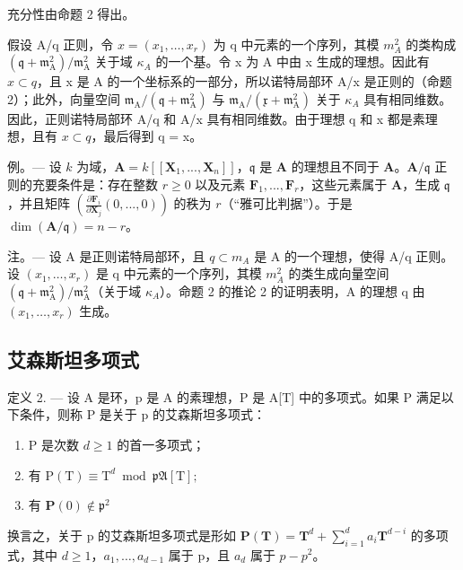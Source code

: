 充分性由命题 2 得出。

假设 A/q 正则，令 \(x = (x_{1}, \ldots, x_{r})\) 为 q 中元素的一个序列，其模 \(m_{A}^{2}\) 的类构成 \((\mathfrak{q} + \mathfrak{m}_{\mathrm{A}}^{2})/\mathfrak{m}_{\mathrm{A}}^{2}\) 关于域 \(\kappa_{A}\) 的一个基。令 x 为 A 中由 x 生成的理想。因此有 \(x \subset q\)，且 x 是 A 的一个坐标系的一部分，所以诺特局部环 A/x 是正则的（命题 2）；此外，向量空间 \(\mathfrak{m}_{\mathrm{A}}/(\mathfrak{q} + \mathfrak{m}_{\mathrm{A}}^{2})\) 与 \(\mathfrak{m}_{\mathrm{A}}/(\mathfrak{x} + \mathfrak{m}_{\mathrm{A}}^{2})\) 关于 \(\kappa_{A}\) 具有相同维数。因此，正则诺特局部环 A/q 和 A/x 具有相同维数。由于理想 q 和 x 都是素理想，且有 \(x \subset q\)，最后得到 q = x。

例。--- 设 \(k\) 为域，\(\mathbf{A} = k[[\mathbf{X}_1, ..., \mathbf{X}_n]]\)，\(\mathfrak{q}\) 是 \(\mathbf{A}\) 的理想且不同于 \(\mathbf{A}\)。\(\mathbf{A}/\mathfrak{q}\) 正则的充要条件是：存在整数 \(r \geqslant 0\) 以及元素 \(\mathbf{F}_1, ..., \mathbf{F}_r\)，这些元素属于 \(\mathbf{A}\)，生成 \(\mathfrak{q}\)，并且矩阵 \(\left(\frac{\partial\mathbf{F}_i}{\partial\mathbf{X}_j}(0, ..., 0)\right)\) 的秩为 \(r\)（“雅可比判据”）。于是 \(\dim(\mathbf{A}/\mathfrak{q}) = n - r\)。

注。--- 设 A 是正则诺特局部环，且 \(q \subset m_{A}\) 是 A 的一个理想，使得 A/q 正则。设 \((x_{1}, \ldots, x_{r})\) 是 q 中元素的一个序列，其模 \(m_{A}^{2}\) 的类生成向量空间 \((\mathfrak{q} + \mathfrak{m}_{\mathrm{A}}^{2}) / \mathfrak{m}_{\mathrm{A}}^{2}\)（关于域 \(\kappa_{A}\)）。命题 2 的推论 2 的证明表明，A 的理想 q 由 \((x_{1}, \ldots, x_{r})\) 生成。

\subsection{艾森斯坦多项式}

定义 2. --- 设 A 是环，p 是 A 的素理想，P 是 A{[}T{]} 中的多项式。如果 P 满足以下条件，则称 P 是关于 p 的艾森斯坦多项式：

\begin{enumerate}
\def\labelenumi{\alph{enumi})}
\item
  P 是次数 \(d \geqslant 1\) 的首一多项式；
\item
  有 \(\mathrm{P(T)}\equiv \mathrm{T}^d\bmod \mathfrak{pA}[\mathrm{T}];\)
\item
  有 \(\mathbf{P}(0)\notin \mathfrak{p}^2\)
\end{enumerate}

换言之，关于 p 的艾森斯坦多项式是形如 \(\mathbf{P}(\mathbf{T}) = \mathbf{T}^{d} + \sum_{i=1}^{d} a_{i} \mathbf{T}^{d-i}\) 的多项式，其中 \(d \geqslant 1\)，\(a_{1}, \ldots, a_{d-1}\) 属于 p，且 \(a_{d}\) 属于 \(p - p^{2}\)。

